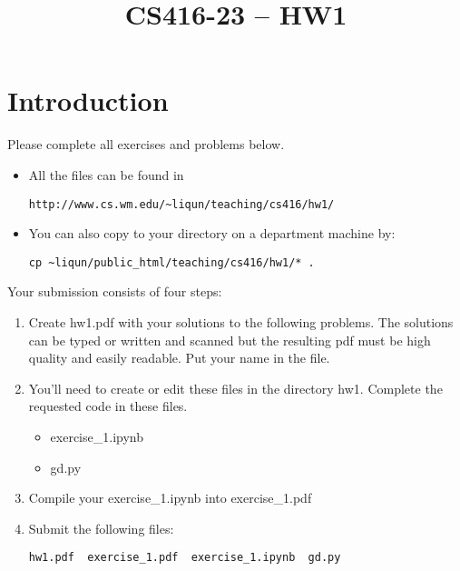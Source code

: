 \documentclass{article}
\title{CS416-23 -- HW1}
\date{}
\begin{document}
\maketitle


\section*{Introduction}


Please complete all exercises and problems below.

\begin{itemize}

\item All the files can be found in 

\begin{verbatim}
http://www.cs.wm.edu/~liqun/teaching/cs416/hw1/
\end{verbatim}

\item  You can also copy to your directory on a department machine by:

\begin{verbatim}
cp ~liqun/public_html/teaching/cs416/hw1/* .
\end{verbatim}
\end{itemize}



{\noindent} Your  submission  consists  of  four  steps:
\begin{enumerate}

\item  Create hw1.pdf with your solutions to the following problems.  
The solutions can be typed or written and 
scanned but the resulting pdf must  be high quality and easily readable.  Put your name in the file.

\item    You’ll need to create or edit these files in the directory hw1. Complete the requested code in these files.

\begin{itemize}
\item exercise\_1.ipynb

\item gd.py

 
\end{itemize}


\item Compile your exercise\_1.ipynb into exercise\_1.pdf

\item Submit the following files: 

\begin{verbatim}
hw1.pdf  exercise_1.pdf  exercise_1.ipynb  gd.py
\end{verbatim}



\end{enumerate}
\end{document}
